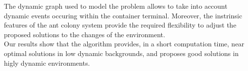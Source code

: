\documentclass[a4paper,10pt]{article}
\begin{document}
The dynamic graph used to model the problem allows to take into account dynamic events occuring within the container terminal. Moreover, the instrinsic features of the ant colony system provide the required flexibility to adjust the proposed solutions to the changes of the environment.\\

Our results show that the algorithm provides, in a short computation time, near optimal solutions in low dynamic backgrounds, and proposes good solutions in higly dynamic environments.




\end{document}
